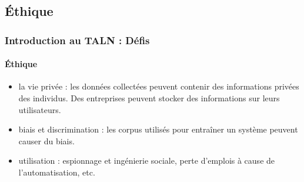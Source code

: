 \documentclass[xcolor=table]{beamer}
\begin{document}
\subsection{Éthique}

\begin{frame}
\frametitle{Introduction au TALN : Défis}
\framesubtitle{Éthique}

\begin{itemize}
	\item la vie privée : les données collectées peuvent contenir des informations privées des individus. Des entreprises peuvent stocker des informations sur leurs utilisateurs. 
	\item biais et discrimination : les corpus utilisés pour entraîner un système peuvent causer du biais.
	\item utilisation : espionnage et ingénierie sociale, perte d'emplois à cause de l'automatisation, etc.
\end{itemize}

\end{frame}

\end{document}
